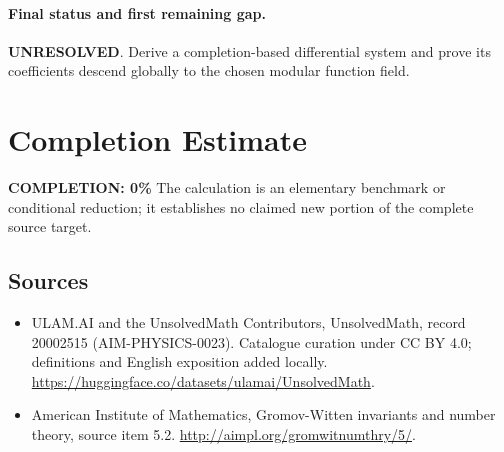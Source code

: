 \documentclass[11pt]{article}
\begin{document}
\paragraph{Final status and first remaining gap.}
\textbf{UNRESOLVED}. Derive a completion-based differential system and prove its coefficients descend globally to the chosen modular function field.

\section{Completion Estimate}
\noindent\textbf{COMPLETION: 0\%}
The calculation is an elementary benchmark or conditional reduction; it establishes no claimed new portion of the complete source target.

\subsection{Sources}
\begin{itemize}
\item[\hypertarget{source:20002515:1}{S1}] ULAM.AI and the UnsolvedMath Contributors, UnsolvedMath, record 20002515 (AIM-PHYSICS-0023). Catalogue curation under CC BY 4.0; definitions and English exposition added locally.
\url{https://huggingface.co/datasets/ulamai/UnsolvedMath}.
\item[\hypertarget{source:20002515:2}{S2}] American Institute of Mathematics, Gromov-Witten invariants and number theory, source item 5.2.
\url{http://aimpl.org/gromwitnumthry/5/}.
\end{itemize}
\label{end:20002515}
\end{document}
